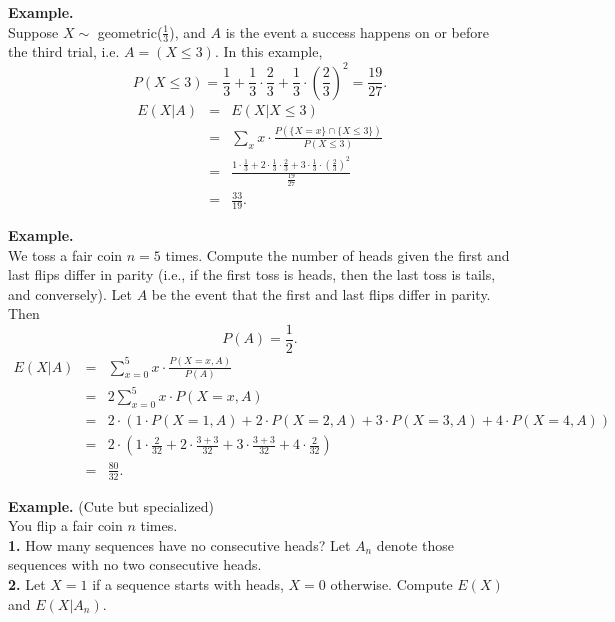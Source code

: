 \documentclass[12pt]{article}
\begin{document}
\noindent \textbf{Example.} \\
Suppose $X \sim$ geometric($\frac{1}{3}$), and $A$ is the event a success happens on or before the third trial, i.e. $A = (X \leq 3)$.
In this example,
$$P(X \leq 3) = \frac{1}{3} + \frac{1}{3} \cdot \frac{2}{3} + \frac{1}{3} \cdot \left(\frac{2}{3}\right)^2 = \frac{19}{27}.$$
\begin{eqnarray*}
    E(X | A) &=& E(X | X \leq 3) \\
    &=& \sum_x x \cdot \frac{P(\{X = x\} \cap \{X \leq 3\})}{P(X \leq 3)} \\
    &=& \frac{1 \cdot \frac{1}{3} + 2 \cdot \frac{1}{3} \cdot \frac{2}{3} + 3 \cdot \frac{1}{3} \cdot \left(\frac{2}{3}\right)^2}{\frac{19}{27}} \\
    &=& \frac{33}{19}.
\end{eqnarray*}

\vspace{0.5cm}

\noindent \textbf{Example.} \\
We toss a fair coin $n = 5$ times. Compute the number of heads given the first and last flips differ in parity (i.e., if the first toss is heads, then the last toss is tails, and conversely).
Let $A$ be the event that the first and last flips differ in parity. Then
$$P(A) = \frac{1}{2}.$$
\begin{eqnarray*}
    E(X | A) &=& \sum_{x = 0}^5 x \cdot \frac{P(X = x, A)}{P(A)} \\
    &=& 2 \sum_{x = 0}^5 x \cdot P(X = x, A) \\
    &=& 2 \cdot (1 \cdot P(X = 1, A) + 2 \cdot P(X = 2, A) + 3 \cdot P(X = 3, A) + 4 \cdot P(X = 4, A)) \\
    &=& 2 \cdot \left( 1 \cdot \frac{2}{32} + 2 \cdot \frac{3 + 3}{32} + 3 \cdot \frac{3 + 3}{32} + 4 \cdot \frac{2}{32}\right) \\
    &=& \frac{80}{32}.
\end{eqnarray*}


\newpage

\noindent \textbf{Example.} (Cute but specialized) \\
You flip a fair coin $n$ times. \\
{\bf 1.} How many sequences have no consecutive heads? Let $A_n$ denote those sequences with no two consecutive heads. \\
{\bf 2.} Let $X = 1$ if a sequence starts with heads, $X = 0$ otherwise. Compute $E(X)$ and $E(X | A_n)$. \\
\end{document}
